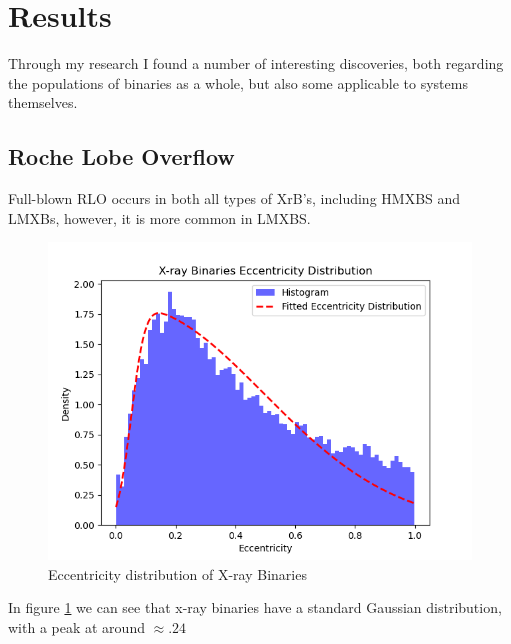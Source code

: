 \documentclass[12pt, letterpaper]{article}
\begin{document}
    \section{\centering Results}
        Through my research I found a number of interesting discoveries, both regarding the populations of binaries as a whole, but also some applicable to systems themselves.
  
        \subsection{\centering Roche Lobe Overflow}
        Full-blown RLO occurs in both all types of XrB's, including HMXBS and LMXBs, however, it is more common in LMXBS.

        \begin{figure}[H]
            \centering
            \includegraphics[scale = .6]{figs/Generated Figs/X-ray Binaries Eccentricty Distribution.png}
            \caption{Eccentricity distribution of X-ray Binaries}
            \label{XrayBinaryEccenDistro}
        \end{figure}

        In figure \ref{XrayBinaryEccenDistro} we can see that x-ray binaries have a standard Gaussian distribution, with a peak at around $\approx .24$  
\end{document}
